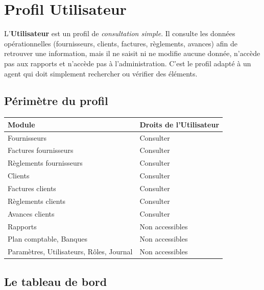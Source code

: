\chapter{Profil Utilisateur}

L'\textbf{Utilisateur} est un profil de \emph{consultation simple}. Il consulte les données opérationnelles (fournisseurs, clients, factures, règlements, avances) afin de retrouver une information, mais il ne saisit ni ne modifie aucune donnée, n'accède pas aux rapports et n'accède pas à l'administration. C'est le profil adapté à un agent qui doit simplement rechercher ou vérifier des éléments.

\section{Périmètre du profil}

\renewcommand{\arraystretch}{1.3}
\begin{longtable}{>{\raggedright\arraybackslash}p{5.4cm} >{\raggedright\arraybackslash}p{9.2cm}}
\toprule
\textbf{Module} & \textbf{Droits de l'Utilisateur} \\
\midrule
\endhead
Fournisseurs & Consulter \\
Factures fournisseurs & Consulter \\
Règlements fournisseurs & Consulter \\
Clients & Consulter \\
Factures clients & Consulter \\
Règlements clients & Consulter \\
Avances clients & Consulter \\
Rapports & Non accessibles \\
Plan comptable, Banques & Non accessibles \\
Paramètres, Utilisateurs, Rôles, Journal & Non accessibles \\
\bottomrule
\end{longtable}
\renewcommand{\arraystretch}{1}


\section{Le tableau de bord}

